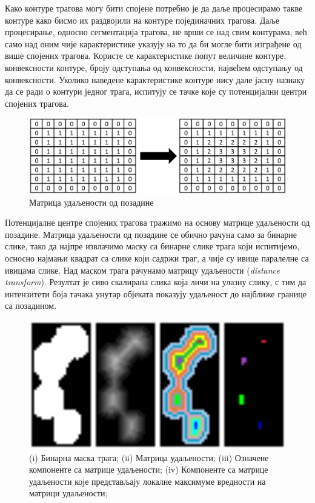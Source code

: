 \documentclass[11pt,a4paper,serbian,oneside]{book}
\begin{document}
Како контуре трагова могу бити спојене  потребно је да даље процесирамо такве контуре како бисмо их раздвојили на контуре појединачних трагова. Даље процесирање, односно сегментација трагова, не врши се над свим контурама, већ само над оним чије ка\-рак\-те\-рис\-ти\-ке указују на то да би могле бити изграђене од више спојених трагова. Користе се ка\-рак\-те\-рис\-ти\-ке попут величине контуре, конвексности контуре, броју одступања од конвексности, највећем одступању од конвексности. Уколико наведене карактеристике контуре нису дале јасну назнаку да се ради о контури једног трага, испитују се тачке које су потенцијални центри спојених трагова.

\begin{figure}[htb]
\begin{center}
\includegraphics[width=120mm]{images/distance_matrix.png}
\end{center}
\caption{Матрица удаљености од позадине}
\label{fig:dist_matric}
\end{figure}

Потенцијалне центре спојених трагова тражимо на основу матрице удаљености од по\-за\-ди\-не. Матрица удаљености од позадине се обично рачуна само за бинарне слике, тако да  најпре извлачимо маску са бинарне слике трага који испитијемо, осносно најмањи квадрат са слике који садржи траг, а чије су ивице паралелне са ивицама слике. Над маском трага рачунамо матрицу удаљености (\textit{distance transform}). Резултат је сиво скалирана слика која личи на улазну слику, с тим да интензитети боја тачака унутар објеката показују удаљеност до најближе границе са позадином.

\begin{figure}[htb]
\begin{center}
\includegraphics[width=150mm]{images/local_maxima.png}
\end{center}
\caption{(i) Бинарна маска трага; (ii) Матрица удаљености; (iii) Означене компоненте са матрице удаљености; (iv) Компоненте са матрице удаљености које представљају локалне максимуме вредности на матрици удаљености; }
\label{fig:local_maxima}
\end{figure}
\end{document}
